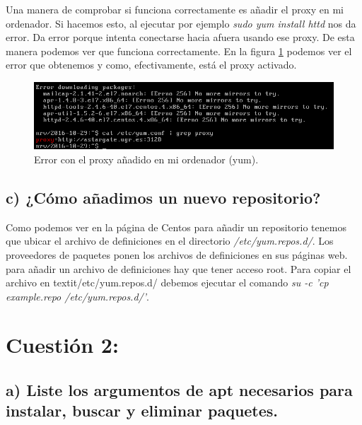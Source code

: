 \documentclass[a4paper,titlepage,12pt]{scrartcl}	%
\numberwithin{figure}{section} %
\numberwithin{table}{section} %
\begin{document}
	Una manera de comprobar si funciona correctamente es añadir el proxy en mi ordenador. Si hacemos esto, al ejecutar por ejemplo \textit{sudo yum install httd} nos da error. Da error porque intenta conectarse hacia afuera usando ese proxy. De esta manera podemos ver que funciona correctamente. En la figura \ref{2-yum-proxy} podemos ver el error que obtenemos y como, efectivamente, está el proxy activado.
	
	\begin{figure}[H]
		\includegraphics[width=\linewidth]{./Imagenes/2-yum-proxy.png}
		\vspace{-0.5cm}
		\caption[Error con el proxy añadido en mi ordenador (yum).]{Error con el proxy añadido en mi ordenador (yum).}
		\label{2-yum-proxy}
	\end{figure}
	
	\subsection[c) ¿Cómo añadimos un nuevo repositorio?]{c) ¿Cómo añadimos un nuevo repositorio?}
	
	Como podemos ver en la página de Centos \cite{yumproxy} para añadir un repositorio tenemos que ubicar el archivo de definiciones en el directorio \textit{/etc/yum.repos.d/}. Los proveedores de paquetes ponen los archivos de definiciones en sus páginas web. para añadir un archivo de definiciones hay que tener acceso root. Para copiar el archivo en textit{/etc/yum.repos.d/} debemos ejecutar el comando \textit{su -c 'cp example.repo /etc/yum.repos.d/'}.

	\section[Cuestión 2:]{Cuestión 2:}
	
	\subsection[a) Liste los argumentos de apt necesarios para instalar, buscar	y eliminar paquetes.]{a) Liste los argumentos de apt necesarios para instalar, buscar y eliminar paquetes.}
	
\end{document}
